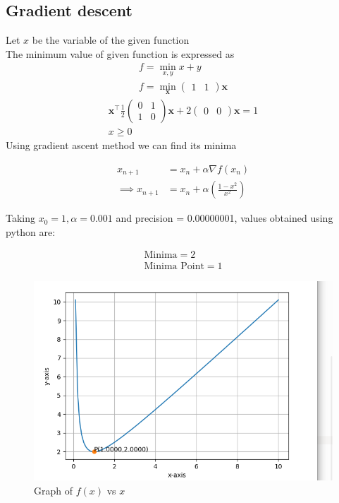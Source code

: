 \documentclass[journal,10pt,twocolumn]{article}
\let\vec\mathbf
\newcommand{\myvec}[1]{\ensuremath{\begin{pmatrix}#1\end{pmatrix}}}
\begin{document}
\subsection*{\normalsize Gradient descent}
Let $x$ be the variable of the given function \\ \vspace{1mm}
The minimum value of given function is expressed as
\begin{align}
	\label{eq:vol_varx}
	f = \min_{x,y}x+y\\
	f = \min_{\vec{x}}\myvec{1&1}\vec{x}
\end{align}
\begin{align}
 \vec{x}^{\top}\frac{1}{2} \myvec{0&1\\1&0}\vec{x}+2\myvec{0&0}\vec{x}=1 \\
x\geq0
\end{align}
Using gradient ascent method we can find its minima\\ \vspace{2mm}

    \begin{align}
        x_{n+1} &= x_n + \alpha \nabla f(x_n) \\
        \implies x_{n+1} &= x_n + \alpha ({\frac{1-x^2}{x^2}})
    \end{align}
    
Taking $x_0=1,\alpha=0.001$ and precision = 0.00000001, values obtained using python are:
    
    \begin{align}
        \boxed{\text{Minima} = 2}\\
        \boxed{\text{Minima Point} = 1}
    \end{align}

\begin{figure}[t]
	\centering
	\includegraphics[width=1\columnwidth]{opt.pdf}
	\caption{Graph of $f(x)$ vs $x$}
	\label{fig:graph_fx}
\end{figure}
\end{document}

